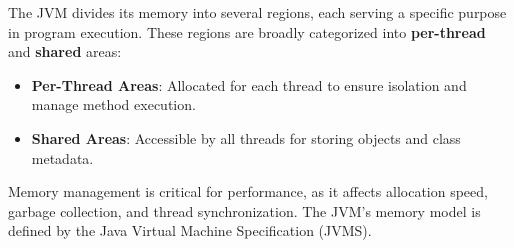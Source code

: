 \documentclass{article}
\begin{document}

The JVM divides its memory into several regions, each serving a specific purpose in program execution. These regions are broadly categorized into \textbf{per-thread} and \textbf{shared} areas:
\begin{itemize}
	\item \textbf{Per-Thread Areas}: Allocated for each thread to ensure isolation and manage method execution.
	\item \textbf{Shared Areas}: Accessible by all threads for storing objects and class metadata.
\end{itemize}
Memory management is critical for performance, as it affects allocation speed, garbage collection, and thread synchronization. The JVM's memory model is defined by the Java Virtual Machine Specification (JVMS).
\end{document}
